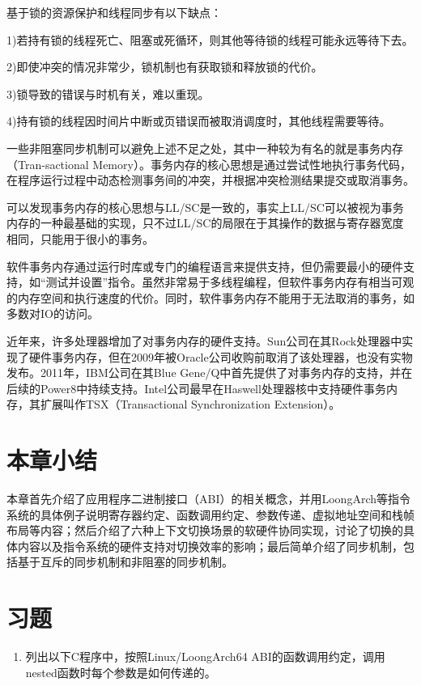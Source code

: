 \documentclass[]{ctexbook}
\providecommand{\tightlist}{%
  \setlength{\itemsep}{0pt}\setlength{\parskip}{0pt}}
\begin{document}
基于锁的资源保护和线程同步有以下缺点：

1)若持有锁的线程死亡、阻塞或死循环，则其他等待锁的线程可能永远等待下去。

2)即使冲突的情况非常少，锁机制也有获取锁和释放锁的代价。

3)锁导致的错误与时机有关，难以重现。

4)持有锁的线程因时间片中断或页错误而被取消调度时，其他线程需要等待。

一些非阻塞同步机制可以避免上述不足之处，其中一种较为有名的就是事务内存（Tran-sactional Memory）。事务内存的核心思想是通过尝试性地执行事务代码，在程序运行过程中动态检测事务间的冲突，并根据冲突检测结果提交或取消事务。

可以发现事务内存的核心思想与LL/SC是一致的，事实上LL/SC可以被视为事务内存的一种最基础的实现，只不过LL/SC的局限在于其操作的数据与寄存器宽度相同，只能用于很小的事务。

软件事务内存通过运行时库或专门的编程语言来提供支持，但仍需要最小的硬件支持，如``测试并设置''指令。虽然非常易于多线程编程，但软件事务内存有相当可观的内存空间和执行速度的代价。同时，软件事务内存不能用于无法取消的事务，如多数对IO的访问。

近年来，许多处理器增加了对事务内存的硬件支持。Sun公司在其Rock处理器中实现了硬件事务内存，但在2009年被Oracle公司收购前取消了该处理器，也没有实物发布。2011年，IBM公司在其Blue Gene/Q中首先提供了对事务内存的支持，并在后续的Power8中持续支持。Intel公司最早在Haswell处理器核中支持硬件事务内存，其扩展叫作TSX（Transactional Synchronization Extension）。

\hypertarget{ux672cux7ae0ux5c0fux7ed3-3}{%
\section{本章小结}\label{ux672cux7ae0ux5c0fux7ed3-3}}

本章首先介绍了应用程序二进制接口（ABI）的相关概念，并用LoongArch等指令系统的具体例子说明寄存器约定、函数调用约定、参数传递、虚拟地址空间和栈帧布局等内容；然后介绍了六种上下文切换场景的软硬件协同实现，讨论了切换的具体内容以及指令系统的硬件支持对切换效率的影响；最后简单介绍了同步机制，包括基于互斥的同步机制和非阻塞的同步机制。

\hypertarget{ux4e60ux9898-3}{%
\section{习题}\label{ux4e60ux9898-3}}

\begin{enumerate}
\def\labelenumi{\arabic{enumi}.}
\tightlist
\item
  列出以下C程序中，按照Linux/LoongArch64 ABI的函数调用约定，调用nested函数时每个参数是如何传递的。
\end{enumerate}
\end{document}
